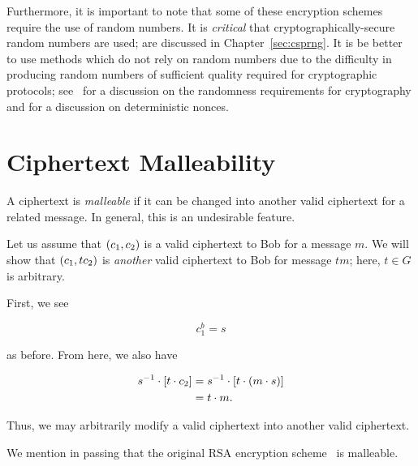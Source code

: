 Furthermore, it is important to note that some of these
\glspl{encryption scheme} require the use of random numbers.
It is \emph{critical} that cryptographically-secure random numbers
are used;  are discussed in Chapter~\ref{sec:csprng}.
It is be better to use methods which do not rely on random numbers
due to the difficulty in producing random numbers of sufficient quality
required for cryptographic protocols;
see~\cite{rfc4086} for a discussion on the randomness requirements
for cryptography and \cite{rfc6979} for a discussion on
deterministic \glspl{nonce}.



\section{Ciphertext Malleability}

A ciphertext is \emph{malleable} if it can be changed into another
valid ciphertext for a related message.
In general, this is an undesirable feature.

\begin{example}
Let us assume that $\left( c_{1},c_{2} \right)$ is a valid ciphertext
to Bob for a message $m$.
We will show that $\left( c_{1},tc_{2} \right)$ is \emph{another} valid ciphertext
to Bob for message $tm$;
here, $t\in G$ is arbitrary.

First, we see

\begin{equation}
    c_{1}^{b} = s
\end{equation}

\noindent
as before.
From here, we also have

\begin{align}
    s^{-1}\cdot \left[ t\cdot c_{2} \right] &= s^{-1}\cdot \left[ t\cdot
            \left( m\cdot s \right) \right]
        \nonumber\\
    &= t\cdot m.
\end{align}

\noindent
Thus, we may arbitrarily modify a valid ciphertext into another valid
ciphertext.
\end{example}

We mention in passing that the original RSA encryption scheme~\cite{RSApaper}
is malleable.

